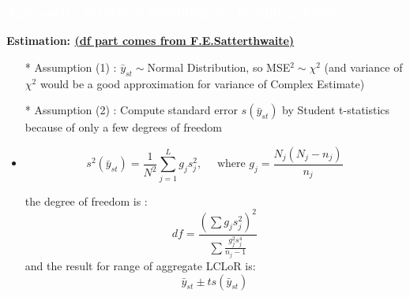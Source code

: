 \documentclass{beamer}	%
\theoremstyle{plain}
\theoremstyle{definition}
\theoremstyle{remark}
\numberwithin{equation}{section}
\begin{document}
\begin{frame}

\frametitle{\textcolor{white}{Approach \uppercase\expandafter{} : Stratified Sampling for Sampling Error}}
\small

\textbf{Estimation: \href{https://pdfs.semanticscholar.org/af4b/3d01c44d7a404f64aa6b8da49cdbc8cb0759.pdf}{\textcolor{UniOrange}{(df part comes from F.E.Satterthwaite)}}}

\begin{itemize}
	\scriptsize
	\item[*] Assumption (1) : $\bar{y}_{s t} \sim $Normal Distribution, so MSE$^{2} \sim \chi^{2}$ (and variance of $\chi^{2}$ would be a good approximation for variance of Complex Estimate)
	\item[*] Assumption (2) : Compute standard error $s(\bar{y}_{s t})$ by Student t-statistics because of only a few degrees of freedom
	\item 
	
	\begin{equation}
s^{2}\left(\bar{y}_{s t}\right)=\frac{1}{N^{2}} \sum_{j=1}^{L} g_{j} s_{j}^{2}, \quad \text { where } g_{j}=\frac{N_{j}\left(N_{j}-n_{j}\right)}{n_{j}}
	\end{equation}
	
	the degree of freedom is :
	\begin{equation}
df=\frac{\left(\sum g_{j} s_{j}^{2}\right)^{2}}{\sum \frac{g_{j}^{2} s_{j}^{4}}{n_{j}-1}}
    \end{equation}
    and the result for range of aggregate LCLoR is:
    \begin{equation}
\bar{y}_{s t} \pm t s\left(\bar{y}_{s t}\right)
	\end{equation}
    
\end{itemize}

\end{frame}
\end{document}
